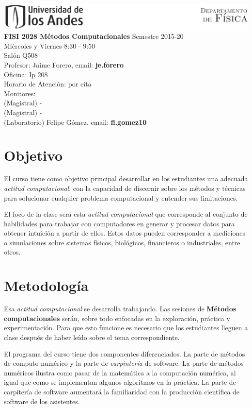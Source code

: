 \documentclass[11pt]{article}
\begin{document}
\includegraphics[width=490pt]{header.png}\\[0.5cm]

\noindent
\textbf{FISI 2028 Métodos Computacionales}
Semestre 2015-20\\
Mi\'ercoles y Viernes 8:30 - 9:50 \\
Salón Q508\\
Profesor: Jaime Forero, email: \textbf{je.forero}\\
Oficina: Ip 208\\
Horario de Atención: por cita\\
Monitores: \\
(Magistral) - \\ 
(Magistral) - \\
(Laboratorio) Felipe G\'omez, email:  \textbf{fl.gomez10}\\


\section*{Objetivo}
El curso tiene como objetivo principal desarrollar en los
estudiantes una adecuada \emph{actitud computacional}, con la capacidad de
discernir sobre los m\'etodos y t\'ecnicas para solucionar cualquier 
problema computacional y entender sus limitaciones.
 
El foco de la clase ser\'a esta \emph{actitud computacional} que
corresponde al conjunto de habilidades para trabajar con computadores
en generar y procesar datos para obtener intuici\'on a partir de ellos. Estos datos pueden
corresponder a mediciones o simulaciones sobre sistemas f\'isicos,
biol\'ogicos, financieros o industriales, entre otros.  

\section*{Metodolog\'ia}
Esa \emph{actitud computacional} se desarrolla trabajando. Las
sesiones de \textbf{M\'etodos computacionales} ser\'an, sobre todo 
enfocadas en la exploraci\'on, pr\'actica y experimentaci\'on. Para que esto
funcione es necesario que los estudiantes lleguen a clase despu\'es de
haber le\'ido sobre el tema correspondiente. 

El programa del curso tiene dos componentes diferenciados. La parte de
m\'etodos de computo num\'erico y la parte de
\emph{carpinter\'ia} de software. La parte de m\'etodos num\'ericos
ilustra como pasar de la matem\'atica a la computaci\'on num\'erica,
al igual que como se implementan algunos algoritmos en la pr\'actica. 
La parte de carpiter\'ia de software aumentar\'a la familiaridad con
la producci\'on cient\'ifica de software de los asistentes.
\end{document}
